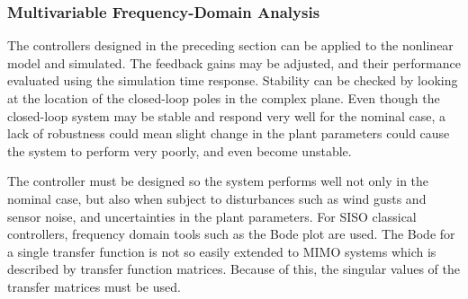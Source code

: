 \subsubsection*{Multivariable Frequency-Domain Analysis}

The controllers designed in the preceding section can be applied to the nonlinear model and simulated.
The feedback gains may be adjusted, and their performance evaluated using the simulation time response.
Stability can be checked by looking at the location of the closed-loop poles in the complex plane.
Even though the closed-loop system may be stable and respond very well for the nominal case, a lack of robustness could mean slight change in the plant parameters could cause the system to perform very poorly, and even become unstable.

The controller must be designed so the system performs well not only in the nominal case, but also when subject to disturbances such as wind gusts and sensor noise, and uncertainties in the plant parameters.
For SISO classical controllers, frequency domain tools such as the Bode plot are used.
The Bode for a single transfer function is not so easily extended to MIMO systems which is described by transfer function matrices.
Because of this, the singular values of the transfer matrices must be used.


